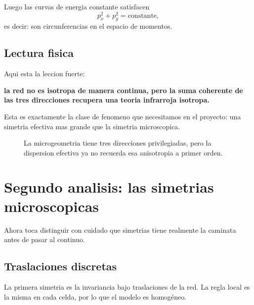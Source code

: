 Luego las curvas de energia constante satisfacen
\begin{equation}
p_x^2+p_y^2 = \text{constante},
\end{equation}
es decir: son circunferencias en el espacio de momentos.

\subsection{Lectura fisica}
Aqui esta la leccion fuerte:
\begin{displayquote}
\textbf{la red no es isotropa de manera continua, pero la suma coherente de las tres direcciones recupera una teoria infrarroja isotropa.}
\end{displayquote}

Esta es exactamente la clase de fenomeno que necesitamos en el proyecto: una simetria efectiva mas grande que la simetria microscopica.

\begin{figure}[h!]
\centering
{}
\caption{La microgeometria tiene tres direcciones privilegiadas, pero la dispersion efectiva ya no recuerda esa anisotropia a primer orden.}
\end{figure}

\section{Segundo analisis: las simetrias microscopicas}
Ahora toca distinguir con cuidado que simetrias tiene realmente la caminata antes de pasar al continuo.

\subsection{Traslaciones discretas}
La primera simetria es la invariancia bajo traslaciones de la red. La regla local es la misma en cada celda, por lo que el modelo es homogéneo.

